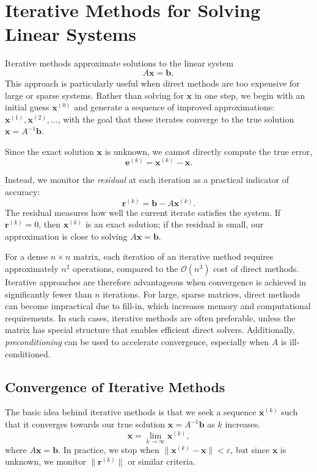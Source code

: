 \chapter{Iterative Methods for Solving Linear Systems}
Iterative methods approximate solutions to the linear system
\begin{equation}
    A\mathbf{x} = \mathbf{b},
    \label{eq:linsys}
\end{equation}
This approach is particularly useful when direct methods are too expensive for large or sparse systems. Rather than solving for \(\mathbf{x}\) in one step, we begin with an initial guess \(\mathbf{x}^{(0)}\) and generate a sequence of improved approximations: \(\mathbf{x}^{(1)}, \mathbf{x}^{(2)}, \ldots\), with the goal that these iterates converge to the true solution \(\mathbf{x} = A^{-1}\mathbf{b}\).

Since the exact solution \(\mathbf{x}\) is unknown, we cannot directly compute the true error,
\begin{equation}
    \mathbf{e}^{(k)} = \mathbf{x}^{(k)} - \mathbf{x}.
\end{equation}

Instead, we monitor the \emph{residual} at each iteration as a practical indicator of accuracy:
\begin{equation}
    \mathbf{r}^{(k)} = \mathbf{b} - A\mathbf{x}^{(k)}.
\end{equation}
The residual measures how well the current iterate satisfies the system.
If \(\mathbf{r}^{(k)} = 0\), then \(\mathbf{x}^{(k)}\) is an exact solution; if the residual is small, our approximation is close to solving \(A\mathbf{x} = \mathbf{b}\).

For a dense \(n \times n\) matrix, each iteration of an iterative method requires approximately \(n^2\) operations, compared to the \(\mathcal{O}(n^3)\) cost of direct methods. Iterative approaches are therefore advantageous when convergence is achieved in significantly fewer than \(n\) iterations.
For large, sparse matrices, direct methods can become impractical due to fill-in, which increases memory and computational requirements. In such cases, iterative methods are often preferable, unless the matrix has special structure that enables efficient direct solvers.
Additionally, \emph{preconditioning} can be used to accelerate convergence, especially when \(A\) is ill-conditioned.

\section{Convergence of Iterative Methods}
\label{sec:iterative-convergence}
The basic idea behind iterative methods is that we seek a sequence \(\mathbf{x}^{(k)}\) such that it converges towards our true solution \(\mathbf{x} = A^{-1}\mathbf{b}\) as \(k\) increases.
\begin{equation}
    \mathbf{x} = \lim_{k \to \infty} \mathbf{x}^{(k)},
\end{equation}
where \(A\mathbf{x} = \mathbf{b}\). In practice, we stop when \(\|\mathbf{x}^{(k)} - \mathbf{x}\| < \varepsilon\), but since \(\mathbf{x}\) is unknown, we monitor \(\|\mathbf{r}^{(k)}\|\) or similar criteria.

